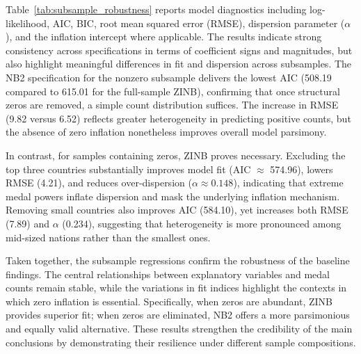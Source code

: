 \documentclass[11pt,twoside]{article}
\numberwithin{Theorem}{section}
\numberwithin{Definition}{section}
\numberwithin{Lemma}{section}
\numberwithin{Algorithm}{section}
\numberwithin{equation}{section}
\begin{document}
Table~\ref{tab:subsample_robustness} reports model diagnostics including log-likelihood, AIC, BIC, root mean squared error (RMSE), dispersion parameter ($\alpha$), and the inflation intercept where applicable. The results indicate strong consistency across specifications in terms of coefficient signs and magnitudes, but also highlight meaningful differences in fit and dispersion across subsamples. The NB2 specification for the nonzero subsample delivers the lowest AIC (508.19 compared to 615.01 for the full-sample ZINB), confirming that once structural zeros are removed, a simple count distribution suffices. The increase in RMSE (9.82 versus 6.52) reflects greater heterogeneity in predicting positive counts, but the absence of zero inflation nonetheless improves overall model parsimony.  

In contrast, for samples containing zeros, ZINB proves necessary. Excluding the top three countries substantially improves model fit (AIC $\approx$ 574.96), lowers RMSE (4.21), and reduces over-dispersion ($\alpha \approx 0.148$), indicating that extreme medal powers inflate dispersion and mask the underlying inflation mechanism. Removing small countries also improves AIC (584.10), yet increases both RMSE (7.89) and $\alpha$ (0.234), suggesting that heterogeneity is more pronounced among mid-sized nations rather than the smallest ones.  

Taken together, the subsample regressions confirm the robustness of the baseline findings. The central relationships between explanatory variables and medal counts remain stable, while the variations in fit indices highlight the contexts in which zero inflation is essential. Specifically, when zeros are abundant, ZINB provides superior fit; when zeros are eliminated, NB2 offers a more parsimonious and equally valid alternative. These results strengthen the credibility of the main conclusions by demonstrating their resilience under different sample compositions.  


\begin{table}[htbp]
\centering
\caption{Subsample robustness checks with ZINB and NB2 models}
\label{tab:subsample_robustness}
\end{table}
\end{document}
